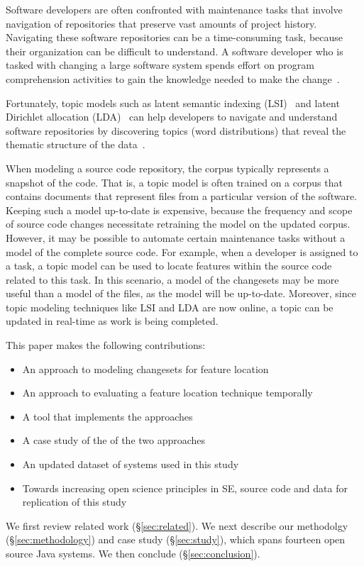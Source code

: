 %

Software developers are often confronted with maintenance tasks that involve navigation of repositories that preserve vast amounts of project history.
 Navigating these software repositories can be a time-consuming task, because their organization can be difficult to understand.
A software developer who is tasked with changing a large software system
spends effort on program comprehension activities to gain the knowledge
needed to make the change~\cite{Corbi:1989}.

 Fortunately, topic models such as latent semantic indexing (LSI)~\cite{Deerwester:1990} and latent Dirichlet allocation (LDA)~\cite{Blei-etal:2003} can help developers to navigate and understand software repositories by discovering topics (word distributions) that reveal the thematic structure of the data~\cite{Linstead-etal:2007,Thomas-etal:2011,Hindle_etal:2012}.


When modeling a source code repository, the corpus typically represents a snapshot of the code.
That is, a topic model is often trained on a corpus that contains documents that represent files from a particular version of the software.
Keeping such a model up-to-date is expensive, because the frequency and scope of source code changes necessitate retraining the model on the updated corpus.
However, it may be possible to automate certain maintenance tasks without a model of the complete source code.
For example, when a developer is assigned to a task, a topic model can be used
to locate features within the source code related to this task.
In this scenario, a model of the changesets may be more useful than a model of the files,
as the model will be up-to-date.
Moreover, since topic modeling techniques like LSI and LDA are now online,
a topic can be updated in real-time as work is being completed.

This paper makes the following contributions:

\begin{itemize}
    \item An approach to modeling changesets for feature location
    \item An approach to evaluating a feature location technique temporally
    \item A tool that implements the approaches
    \item A case study of the of the two approaches 
    \item An updated dataset of systems used in this study
    \item Towards increasing open science principles in SE,
        source code and data for replication of this study
\end{itemize}

We first review related work (\S\ref{sec:related}).
We next describe our methodolgy (\S\ref{sec:methodology}) and case study (\S\ref{sec:study}),
which spans fourteen open source Java systems.
We then conclude (\S\ref{sec:conclusion}).

